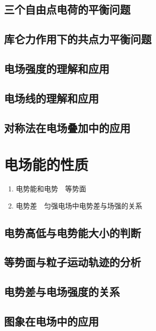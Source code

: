 \documentclass[cn,11pt,mac, simple]{elegantbook}
\begin{document}
\clearpage\section{三个自由点电荷的平衡问题}

\clearpage\section{库仑力作用下的共点力平衡问题}

\clearpage\section{电场强度的理解和应用}

\clearpage\section{电场线的理解和应用}

\clearpage\section{对称法在电场叠加中的应用}
\chapter{电场能的性质}
\begin{enumerate}
   \item 电势能和电势　等势面
   \item 电势差　匀强电场中电势差与场强的关系
\end{enumerate}

\clearpage\section{电势高低与电势能大小的判断}

\clearpage\section{等势面与粒子运动轨迹的分析}

\clearpage\section{电势差与电场强度的关系}

\clearpage\section{图象在电场中的应用}
\end{document}
